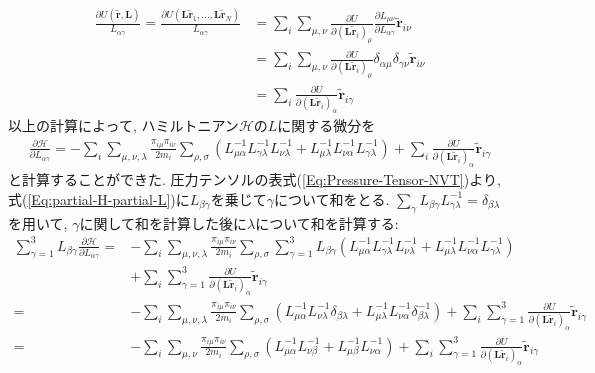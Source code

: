 \begin{align}
  \frac{\partial U(\tilde{\bm{r}}, \bm{L})}{L_{\alpha\gamma}} =
  \frac{\partial U(\bm{L}\tilde{\bm{r}}_{1},\ldots,\bm{L}\tilde{\bm{r}}_{N})}{L_{\alpha\gamma}} &=
  \sum_{i}\sum_{\mu,\nu}
  \frac{\partial U}{\partial (\bm{L}\tilde{\bm{r}}_{i})_{\mu}}
  \frac{\partial L_{\mu\nu}}{\partial L_{\alpha\gamma}}\tilde{\bm{r}}_{i\nu} \\ &=
  \sum_{i}\sum_{\mu,\nu}
  \frac{\partial U}{\partial (\bm{L}\tilde{\bm{r}}_{i})_{\mu}}
  \delta_{\alpha\mu}\delta_{\gamma\nu}\tilde{\bm{r}}_{i\nu} \\ &=
  \sum_{i} \frac{\partial U}{\partial (\bm{L}\tilde{\bm{r}}_{i})_{\alpha}} \tilde{\bm{r}}_{i\gamma}
\end{align}
以上の計算によって, ハミルトニアン$\mathcal{H}$の$L$に関する微分を
\begin{align}
  \frac{\partial \mathcal{H}}{\partial L_{\alpha\gamma}} =
  -\sum_{i} \sum_{\mu,\nu,\lambda} \frac{\pi_{i\mu}\pi_{i\nu}}{2m_{i}}
  \sum_{\rho,\sigma}
  \left(
    L_{\mu\alpha}^{-1} L_{\gamma\lambda}^{-1} L_{\nu\lambda}^{-1} +
    L_{\mu\lambda}^{-1} L_{\nu\alpha}^{-1} L_{\gamma\lambda}^{-1}
  \right) +
  \sum_{i} \frac{\partial U}{\partial (\bm{L}\tilde{\bm{r}}_{i})_{\alpha}} \tilde{\bm{r}}_{i\gamma}
  \label{Eq:partial-H-partial-L}
\end{align}
と計算することができた. 圧力テンソルの表式(\ref{Eq:Pressure-Tensor-NVT})より, 式(\ref{Eq:partial-H-partial-L})に$L_{\beta\gamma}$を乗じて$\gamma$について和をとる. 
$\sum_{\gamma} L_{\beta\gamma}L_{\gamma\lambda}^{-1} = \delta_{\beta\lambda}$を用いて, $\gamma$に関して和を計算した後に$\lambda$について和を計算する:
\begin{align}
  \sum_{\gamma=1}^{3} L_{\beta\gamma} \frac{\partial \mathcal{H}}{\partial L_{\alpha\gamma}} =&
  -\sum_{i} \sum_{\mu,\nu,\lambda} \frac{\pi_{i\mu}\pi_{i\nu}}{2m_{i}}
  \sum_{\rho,\sigma} \sum_{\gamma=1}^{3} L_{\beta\gamma}
  \left(
    L_{\mu\alpha}^{-1} L_{\gamma\lambda}^{-1} L_{\nu\lambda}^{-1} +
    L_{\mu\lambda}^{-1} L_{\nu\alpha}^{-1} L_{\gamma\lambda}^{-1}
  \right) \\ &+
  \sum_{i} \sum_{\gamma=1}^{3} \frac{\partial U}{\partial (\bm{L}\tilde{\bm{r}}_{i})_{\alpha}} \tilde{\bm{r}}_{i\gamma}
  \\
  =&
  -\sum_{i} \sum_{\mu,\nu,\lambda} \frac{\pi_{i\mu}\pi_{i\nu}}{2m_{i}}
  \sum_{\rho,\sigma}
  \left(
    L_{\mu\alpha}^{-1} L_{\nu\lambda}^{-1} \delta_{\beta\lambda} +
    L_{\mu\lambda}^{-1} L_{\nu\alpha}^{-1} \delta_{\beta\lambda}^{-1}
  \right) +
  \sum_{i} \sum_{\gamma=1}^{3} \frac{\partial U}{\partial (\bm{L}\tilde{\bm{r}}_{i})_{\alpha}} \tilde{\bm{r}}_{i\gamma}
  \\
  =&
  -\sum_{i} \sum_{\mu,\nu} \frac{\pi_{i\mu}\pi_{i\nu}}{2m_{i}}
  \sum_{\rho,\sigma}
  \left(
    L_{\mu\alpha}^{-1} L_{\nu\beta}^{-1} +
    L_{\mu\beta}^{-1} L_{\nu\alpha}^{-1}
  \right) +
  \sum_{i} \sum_{\gamma=1}^{3} \frac{\partial U}{\partial (\bm{L}\tilde{\bm{r}}_{i})_{\alpha}} \tilde{\bm{r}}_{i\gamma}
\end{align}

